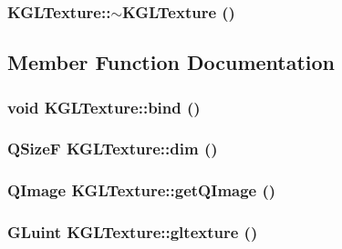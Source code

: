 \hypertarget{class_k_g_l_texture_c4b477f122904517bd16cc6d55e9a5e3}{
\subsubsection[{$\sim$KGLTexture}]{\setlength{\rightskip}{0pt plus 5cm}KGLTexture::$\sim$KGLTexture ()}}
\label{class_k_g_l_texture_c4b477f122904517bd16cc6d55e9a5e3}




\subsection{Member Function Documentation}
\hypertarget{class_k_g_l_texture_ca185912b1f981310404c4be89dd9d52}{
\subsubsection[{bind}]{\setlength{\rightskip}{0pt plus 5cm}void KGLTexture::bind ()}}
\label{class_k_g_l_texture_ca185912b1f981310404c4be89dd9d52}


\hypertarget{class_k_g_l_texture_0ce53b8e563c610c0611c7635f885049}{
\subsubsection[{dim}]{\setlength{\rightskip}{0pt plus 5cm}QSizeF KGLTexture::dim ()}}
\label{class_k_g_l_texture_0ce53b8e563c610c0611c7635f885049}


\hypertarget{class_k_g_l_texture_d8819075431c2c07c4e606565a072a8d}{
\subsubsection[{getQImage}]{\setlength{\rightskip}{0pt plus 5cm}QImage KGLTexture::getQImage ()}}
\label{class_k_g_l_texture_d8819075431c2c07c4e606565a072a8d}


\hypertarget{class_k_g_l_texture_f6699b639b1c5b5c8ba71040961a1ac3}{
\subsubsection[{gltexture}]{\setlength{\rightskip}{0pt plus 5cm}GLuint KGLTexture::gltexture ()}}
\label{class_k_g_l_texture_f6699b639b1c5b5c8ba71040961a1ac3}


